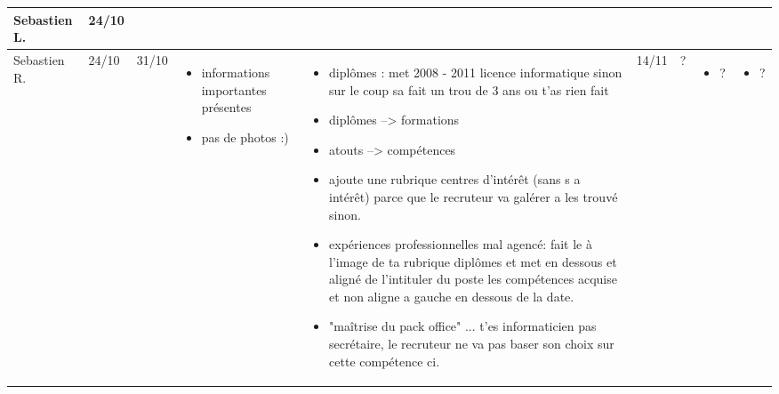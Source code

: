 \documentclass[a4paper,11pt]{article}
\begin{document}
\begin{landscape}
\begin{longtable}{|l|l|l|p{4cm}|p{4cm}|l|l|p{4cm}|p{4cm}|}
    Sebastien L. & 24/10 & & & & & & & \\ \hline

    Sebastien R.  & 24/10 & 31/10
		  & \begin{itemize}
		    \item informations importantes présentes
		    \item pas de photos :)
		    \end{itemize}
		  & \begin{itemize}
		    \item diplômes : met 2008 - 2011 licence informatique sinon sur le coup sa fait un trou de 3 ans ou t'as rien fait
		    \item diplômes --> formations
		    \item atouts --> compétences
		    \item ajoute une rubrique centres d'intérêt (sans s a intérêt) parce que le recruteur  va galérer a les trouvé sinon.
		    \item expériences professionnelles mal agencé: fait le à l'image de ta rubrique diplômes et met en dessous et aligné de l'intituler du poste les compétences acquise et non aligne a gauche en dessous de la date.
		    \item "maîtrise du pack office" ... t'es informaticien pas secrétaire, le recruteur ne va pas baser son choix sur cette compétence ci.
		    \end{itemize}
		  & 14/11 & ?
		  & \begin{itemize}
		    \item ?
		    \end{itemize}
		  & \begin{itemize}
		    \item ?
		    \end{itemize} \\ \hline


\end{longtable}
\end{landscape}
\end{document}
